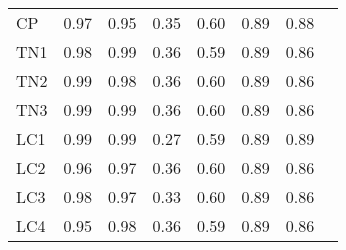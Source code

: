 \documentclass[./dissertation.tex]{subfiles}
\begin{document}
\begin{table}
\begin{tabular}{|l|c|c|c|c|c|c|c|}
        CP                                       & 0.97                                 & 0.95                                  & 0.35                                   & 0.60                                    & 0.89                                   & 0.88                                     \\
        TN1                                      & 0.98                                 & 0.99                                  & 0.36                                   & 0.59                                    & 0.89                                   & 0.86                                     \\
        TN2                                      & 0.99                                 & 0.98                                  & 0.36                                   & 0.60                                    & 0.89                                   & 0.86                                     \\
        TN3                                      & 0.99                                 & 0.99                                  & 0.36                                   & 0.60                                    & 0.89                                   & 0.86                                     \\
        LC1                                      & 0.99                                 & 0.99                                  & 0.27                                   & 0.59                                    & 0.89                                   & 0.89                                     \\
        LC2                                      & 0.96                                 & 0.97                                  & 0.36                                   & 0.60                                    & 0.89                                   & 0.86                                     \\
        LC3                                      & 0.98                                 & 0.97                                  & 0.33                                   & 0.60                                    & 0.89                                   & 0.86                                     \\
        LC4                                      & 0.95                                 & 0.98                                  & 0.36                                   & 0.59                                    & 0.89                                   & 0.86                                     \\

\end{tabular}
\end{table}
\end{document}
